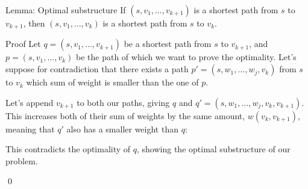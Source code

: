 \documentclass[a4paper]{article}
\begin{document}
\begin{parag}{Lemma: Optimal substructure}
    If $\left(s, v_1, \ldots, v_{k+1}\right)$ is a shortest path from $s$ to $v_{k+1}$, then $\left(s, v_1, \ldots, v_k\right)$ is a shortest path from $s$ to $v_k$.

    \begin{subparag}{Proof}
        Let $q = \left(s, v_1, \ldots, v_{k+1}\right)$ be a shortest path from $s$ to $v_{k+1}$, and $p = \left(s, v_1, \ldots, v_k\right)$ be the path of which we want to prove the optimality. Let's suppose for contradiction that there exists a path $p' = \left(s, w_1, \ldots, w_{j}, v_k\right)$ from $s$ to $v_k$ which sum of weight is smaller than the one of $p$. 

        Let's append $v_{k+1}$ to both our paths, giving $q$ and $q' = \left(s, w_1, \ldots, w_j, v_k, v_{k+1}\right)$. This increases both of their sum of weights by the same amount, $w\left(v_k, v_{k+1}\right)$, meaning that $q'$ also has a smaller weight than $q$:
        
        This contradicts the optimality of $q$, showing the optimal substructure of our problem.

        \qed
    \end{subparag}
\end{parag}
\end{document}
